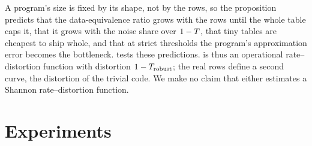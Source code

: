 \documentclass{article}
\theoremstyle{remark}
\newcommand{\Tr}{T_{\mathrm{robust}}}
\begin{document}
A program's size is fixed by its shape, not by the rows, so the proposition predicts that the
data-equivalence ratio grows with the rows until the whole table caps it, that it grows with the noise share
over $1 - T$, that tiny tables are cheapest to ship whole, and that at strict thresholds the program's
approximation error becomes the bottleneck.  tests these predictions. \MetricName{} is thus an operational rate--distortion function
with distortion $\One - \Tr$; the real rows define a second curve, the distortion of the trivial code.
We make no claim that either estimates a Shannon rate--distortion function.

\section{Experiments}
\label{sec:experiments}
\end{document}

